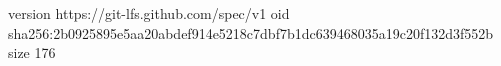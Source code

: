 version https://git-lfs.github.com/spec/v1
oid sha256:2b0925895e5aa20abdef914e5218c7dbf7b1dc639468035a19c20f132d3f552b
size 176
